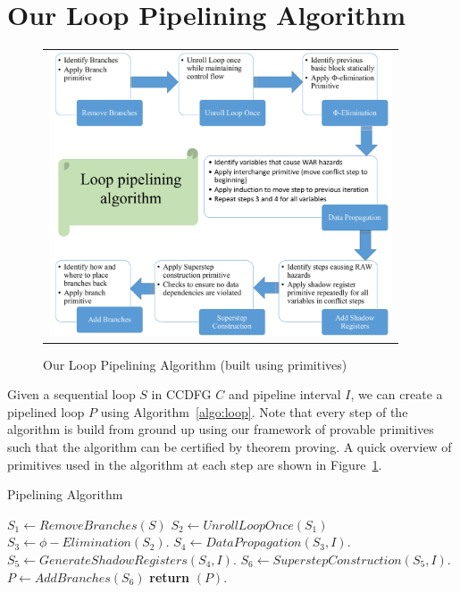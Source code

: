 \section{Our Loop Pipelining Algorithm}
\begin{figure}[t!]
\begin{center}
\begin{tabular}{c}
\includegraphics[width=4in]{fig-proposal/algorithm-using-primitives}
\end{tabular}
\end{center}
\caption{Our Loop Pipelining Algorithm (built using primitives)}
\label{fig:algorithm-using-primitives}
\end{figure}

Given a sequential loop $S$ in CCDFG $C$ and pipeline interval $I$, we can create a pipelined loop $P$ using Algorithm~\ref{algo:loop}. Note that every step of the algorithm is build from ground up using our framework of provable primitives such that the algorithm can be certified by theorem proving. A quick overview of primitives used in the algorithm at each step are shown in Figure~\ref{fig:algorithm-using-primitives}.

\begin{algorithm}[H]
\caption{Pipelining Algorithm}
\label{algo:loop}
\begin{algorithmic}[1]
\State $S_1 \leftarrow RemoveBranches(S)$
\State $S_2 \leftarrow UnrollLoopOnce(S_1)$
\State $S_3 \leftarrow \phi-Elimination (S_2) $.
\State $S_4 \leftarrow DataPropagation (S_3, I) $.
\State $S_5 \leftarrow GenerateShadowRegisters (S_4, I) $.
\State $ S_6 \leftarrow SuperstepConstruction (S_5, I) $.
\State $P \leftarrow AddBranches (S_6) $
\State \textbf{return} $(P)$.
\EndProcedure
\end{algorithmic}
\end{algorithm}

